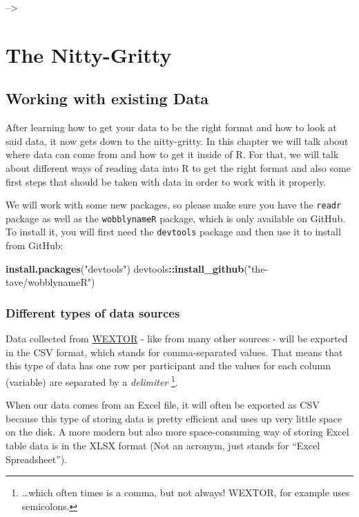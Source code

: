 \documentclass[
]{book}
\newenvironment{Shaded}{\begin{snugshade}}{\end{snugshade}}
\newcommand{\FunctionTok}[1]{\textcolor[rgb]{0.13,0.29,0.53}{\textbf{#1}}}
\newcommand{\NormalTok}[1]{#1}
\newcommand{\SpecialCharTok}[1]{\textcolor[rgb]{0.81,0.36,0.00}{\textbf{#1}}}
\newcommand{\StringTok}[1]{\textcolor[rgb]{0.31,0.60,0.02}{#1}}
\begin{document}
--\textgreater{}

\part{The Nitty-Gritty}\label{part-the-nitty-gritty}

\chapter{Working with existing Data}\label{exdata}

After learning how to get your data to be the right format and how to look at said data, it now gets down to the nitty-gritty.
In this chapter we will talk about where data can come from and how to get it inside of R.
For that, we will talk about different ways of reading data into R to get the right format and also some first steps that should be taken with data in order to work with it properly.

We will work with some new packages, so please make sure you have the \texttt{readr} package as well as the \texttt{wobblynameR} package, which is only available on GitHub.
To install it, you will first need the \texttt{devtools} package and then use it to install from GitHub:

\begin{Shaded}
\begin{Highlighting}[]
\FunctionTok{install.packages}\NormalTok{(}\StringTok{"devtools"}\NormalTok{)}
\NormalTok{devtools}\SpecialCharTok{::}\FunctionTok{install\_github}\NormalTok{(}\StringTok{"the{-}tave/wobblynameR"}\NormalTok{)}
\end{Highlighting}
\end{Shaded}

\section{Different types of data sources}\label{different-types-of-data-sources}

Data collected from \href{https://www.wextor.eu}{WEXTOR} - like from many other sources - will be exported in the CSV format, which stands for comma-separated values.
That means that this type of data has one row per participant and the values for each column (variable) are separated by a \emph{delimiter} \footnote{\ldots which often times is a comma, but not always! WEXTOR, for example uses semicolons.}.

When our data comes from an Excel file, it will often be exported as CSV because this type of storing data is pretty efficient and uses up very little space on the disk.
A more modern but also more space-consuming way of storing Excel table data is in the XLSX format (Not an acronym, just stands for ``Excel Spreadsheet'').
\end{document}
